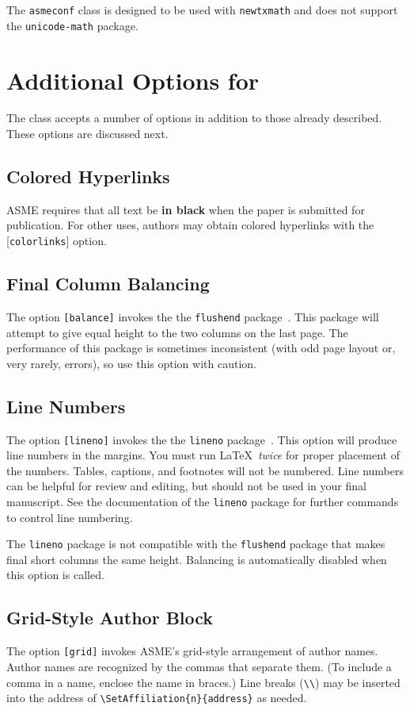 \documentclass[balance,upint,subscriptcorrection,varvw,mathalfa=cal=boondoxo,spanish,french,vietnamese,russian,greek,pdf-a,fontspec,colorlinks]{asmeconf}
\begin{document}
The \texttt{asmeconf} class is designed to be used with \texttt{newtxmath} and does not support the \texttt{unicode-math} package.



\section{Additional Options for }
The class accepts a number of options in addition to those already described. These options are discussed next.

\subsection{Colored Hyperlinks}
ASME requires that all text be \textbf{in black} when the paper is submitted for publication.  For other uses, authors may
obtain colored hyperlinks with the [\texttt{colorlinks}] option.

\subsection{Final Column Balancing} The option \texttt{[balance]} invokes the the \texttt{flushend} package~\cite{tolusis}.
This package will attempt to give equal height to the two columns on the last page. The performance of this package is sometimes inconsistent (with odd page layout or, very rarely, errors), so use this option with caution.

\subsection{Line Numbers} The option \texttt{[lineno]} invokes the the \texttt{lineno} package~\cite{bottcher}. This option will produce line numbers in the margins. You must run \LaTeX\ \textit{twice} for proper placement of the numbers. Tables, captions, and footnotes will not be numbered.  Line numbers can be helpful for review and editing, but should not be used in your final manuscript. See the documentation of the \texttt{lineno} package for further commands to control line numbering. 

The \texttt{lineno} package is not compatible with the \texttt{flushend} package that makes final short columns the same height. Balancing is automatically disabled when this option is called. 

\subsection{Grid-Style Author Block} The option \texttt{[grid]} invokes ASME's grid-style arrangement of author names. Author names are recognized by the commas that separate them. (To include a comma in a name, enclose the name in braces.) Line breaks (\verb|\\|) may be inserted into the address of \verb|\SetAffiliation{n}{address}| as needed. 
\end{document}
